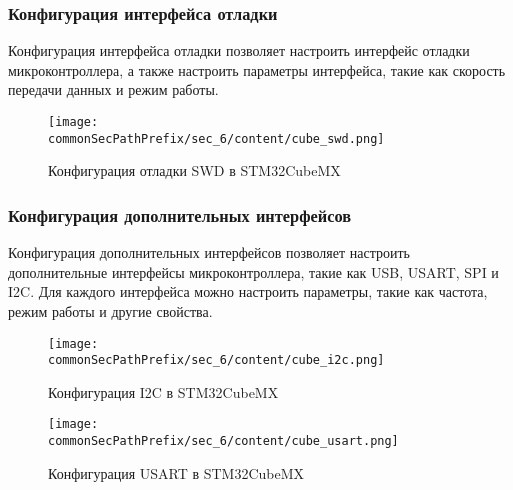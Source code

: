 \subsubsection{Конфигурация интерфейса отладки}
Конфигурация интерфейса отладки позволяет настроить интерфейс отладки микроконтроллера, а также настроить параметры интерфейса, такие как скорость передачи данных и режим работы. 
\begin{figure}[ht]
    \centering
    \texttt{[image: \\commonSecPathPrefix/sec\_6/content/cube\_swd.png]}
    \caption{Конфигурация отладки SWD в STM32CubeMX}
\end{figure}

\subsubsection{Конфигурация дополнительных интерфейсов}
Конфигурация дополнительных интерфейсов позволяет настроить дополнительные интерфейсы микроконтроллера, такие как USB, USART, SPI и I2C. Для каждого интерфейса можно настроить параметры, такие как частота, режим работы и другие свойства.
\begin{figure}[ht]
    \centering
    \texttt{[image: \\commonSecPathPrefix/sec\_6/content/cube\_i2c.png]}
    \caption{Конфигурация I2C в STM32CubeMX}
\end{figure}
\begin{figure}[ht]
    \centering
    \texttt{[image: \\commonSecPathPrefix/sec\_6/content/cube\_usart.png]}
    \caption{Конфигурация USART в STM32CubeMX}
\end{figure}